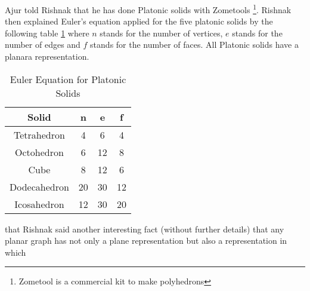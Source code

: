 Ajur told Rishnak that he has done Platonic solids with Zometools \footnote{Zometool is a commercial kit to make polyhedrons}. Rishnak then explained Euler's equation applied for the five platonic solids by the following table \ref{tab:platonic} where $n$ stands for the number of vertices, $e$ stands for the number of edges and $f$ stands for the number of faces. All Platonic solids have a planara representation.
\begin{table}[]
    \centering
    \begin{tabular}{||c|c|c|c||}
    \hline
    Solid & n & e& f \\ [0.5ex] 
 \hline\hline
 Tetrahedron& 4 & 6 & 4 \\ 
 \hline
 Octohedron & 6 & 12& 8 \\
 \hline
 Cube & 8 & 12 & 6 \\
 \hline
 Dodecahedron & 20 & 30 & 12 \\
 \hline
 Icosahedron & 12 & 30 & 20 \\ [1ex] 
 \hline
 \end{tabular}
    \caption{Euler Equation for Platonic Solids}
    \label{tab:platonic}
\end{table}


that  Rishnak said another interesting fact (without further details) that any planar graph has not only a plane representation but also a representation in which